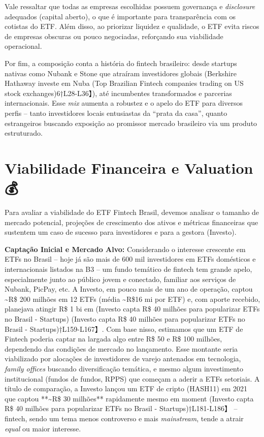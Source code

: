 \documentclass[12pt]{article}
\begin{document}
Vale ressaltar que todas as empresas escolhidas possuem governança e \textit{disclosure} adequados (capital aberto), o que é importante para transparência com os cotistas do ETF. Além disso, ao priorizar liquidez e qualidade, o ETF evita riscos de empresas obscuras ou pouco negociadas, reforçando sua viabilidade operacional.

Por fim, a composição conta a história do fintech brasileiro: desde startups nativas como Nubank e Stone que atraíram investidores globais (Berkshire Hathaway investe em Nuba (Top Brazilian Fintech companies trading on US stock exchanges)6†L28-L36】), até incumbentes transformados e parcerias internacionais. Esse \textit{mix} aumenta a robustez e o apelo do ETF para diversos perfis – tanto investidores locais entusiastas da “prata da casa”, quanto estrangeiros buscando exposição ao promissor mercado brasileiro via um produto estruturado.

\section*{Viabilidade Financeira e Valuation 💰}

Para avaliar a viabilidade do ETF Fintech Brasil, devemos analisar o tamanho de mercado potencial, projeções de crescimento dos ativos e métricas financeiras que sustentem um caso de sucesso para investidores e para a gestora (Investo).

\textbf{Captação Inicial e Mercado Alvo:} Considerando o interesse crescente em ETFs no Brasil – hoje já são mais de 600 mil investidores em ETFs domésticos e internacionais listados na B3 – um fundo temático de fintech tem grande apelo, especialmente junto ao público jovem e conectado, familiar aos serviços de Nubank, PicPay, etc. A Investo, em pouco mais de um ano de operação, captou \textasciitilde R\$ 200 milhões em 12 ETFs (média \textasciitilde R\$16 mi por ETF) e, com aporte recebido, planejava atingir R\$ 1 bi em (Investo capta R\$ 40 milhões para popularizar ETFs no Brasil - Startups) (Investo capta R\$ 40 milhões para popularizar ETFs no Brasil - Startups)†L159-L167】. Com base nisso, estimamos que um ETF de Fintech poderia captar na largada algo entre R\$ 50 e R\$ 100 milhões, dependendo das condições de mercado no lançamento. Esse montante seria viabilizado por alocações de investidores de varejo antenados em tecnologia, \textit{family offices} buscando diversificação temática, e mesmo algum investimento institucional (fundos de fundos, RPPS) que começam a aderir a ETFs setoriais. A título de comparação, a Investo lançou um ETF de cripto (HASH11) em 2021 que captou **\textasciitilde R\$ 30 milhões** rapidamente mesmo em moment (Investo capta R\$ 40 milhões para popularizar ETFs no Brasil - Startups)†L181-L186】 – fintech, sendo um tema menos controverso e mais \textit{mainstream}, tende a atrair \textit{equal} ou maior interesse.
\end{document}
